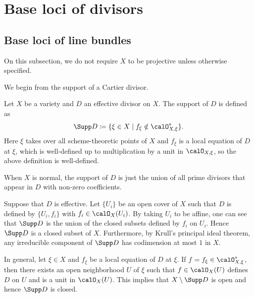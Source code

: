 \section{Base loci of divisors}




\subsection{Base loci of line bundles}

  On this subsection, we do not require $X$ to be projective unless otherwise specified.

  We begin from the support of a Cartier divisor.

  \begin{definition}
    Let $X$ be a variety and $D$ an effective divisor on $X$.
    The support of $D$ is defined as 
    \[ \Supp D \coloneqq \{ \xi \in X \mid f_\xi \notin \calO_{X,\xi}^* \}. \]
    Here $\xi$ takes over all scheme-theoretic points of $X$ and $f_\xi$ is a local equation of $D$ at $\xi$, which is well-defined up to multiplication by a unit in $\calO_{X,\xi}$, so the above definition is well-defined.
  \end{definition}

  When $X$ is normal, the support of $D$ is just the union of all prime divisors that appear in $D$ with non-zero coefficients.

  Suppose that $D$ is effective.
  Let $\{U_i\}$ be an open cover of $X$ such that $D$ is defined by $\{U_i, f_i\}$ with $f_i \in \calO_X(U_i)$.
  By taking $U_i$ to be affine, one can see that $\Supp D$ is the union of the closed subsets defined by $f_i$ on $U_i$.
  Hence $\Supp D$ is a closed subset of $X$.
  Furthermore, by Krull's principal ideal theorem, any irreducible component of $\Supp D$ has codimension at most $1$ in $X$.

  In general, let $\xi \in X$ and $f_\xi$ be a local equation of $D$ at $\xi$.
  If $f = f_\xi \in \calO_{X,\xi}^*$, then there exists an open neighborhood $U$ of $\xi$ such that $f \in \calO_X(U)$ defines $D$ on $U$ and is a unit in $\calO_X(U)$.
  This implies that $X \setminus \Supp D$ is open and hence $\Supp D$ is closed.
  

